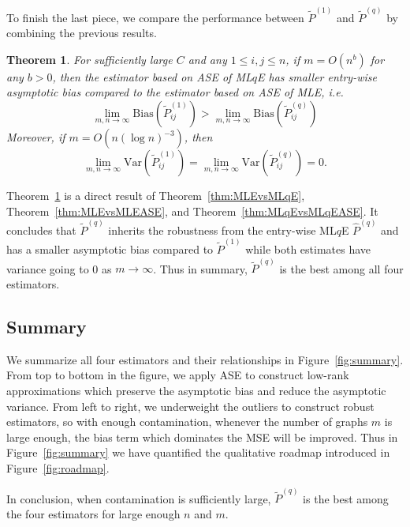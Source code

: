 \documentclass[a4paper]{article}
\newtheorem{theorem}[fact]{Theorem}
\renewcommand{\hat}{\widehat}
\begin{document}
To finish the last piece, we compare the performance between $\widetilde{P}^{(1)}$ and $\widetilde{P}^{(q)}$ by combining the previous results.

\begin{theorem}
\label{thm:MLEASEvsMLqEASE}
For sufficiently large $C$ and any $1 \le i,j \le n$, if $m = O(n^b)$ for any $b > 0$, then the estimator based on ASE of ML$q$E has smaller entry-wise asymptotic bias compared to the estimator based on ASE of MLE, i.e.\
\[
	\lim_{m, n \to \infty} \mathrm{Bias}(\widetilde{P}_{ij}^{(1)})
    > \lim_{m, n \to \infty} \mathrm{Bias}(\widetilde{P}_{ij}^{(q)})
\]
Moreover, if $m = O(n (\log n)^{-3})$, then
\[
	\lim_{m, n \to \infty} \mathrm{Var}(\widetilde{P}_{ij}^{(1)})
    = \lim_{m, n \to \infty} \mathrm{Var}(\widetilde{P}_{ij}^{(q)}) = 0.
\]
\end{theorem}

Theorem~\ref{thm:MLEASEvsMLqEASE} is a direct result of Theorem~\ref{thm:MLEvsMLqE}, Theorem~\ref{thm:MLEvsMLEASE}, and Theorem~\ref{thm:MLqEvsMLqEASE}.
It concludes that $\widetilde{P}^{(q)}$ inherits the robustness from the entry-wise ML$q$E $\hat{P}^{(q)}$ and has a smaller asymptotic bias compared to $\widetilde{P}^{(1)}$ while both estimates have variance going to 0 as $m \to \infty$. Thus in summary, $\widetilde{P}^{(q)}$ is the best among all four estimators.


\subsection{Summary}
We summarize all four estimators and their relationships in Figure~\ref{fig:summary}.
From top to bottom in the figure, we apply ASE to construct low-rank approximations which preserve the asymptotic bias and reduce the asymptotic variance. From left to right, we underweight the outliers to construct robust estimators, so with enough contamination, whenever the number of graphs $m$ is large enough, the bias term which dominates the MSE will be improved.
Thus in Figure~\ref{fig:summary} we have quantified the qualitative roadmap introduced in Figure~\ref{fig:roadmap}.


In conclusion, when contamination is sufficiently large, $\widetilde{P}^{(q)}$ is the best among the four estimators for large enough $n$ and $m$.
\end{document}
